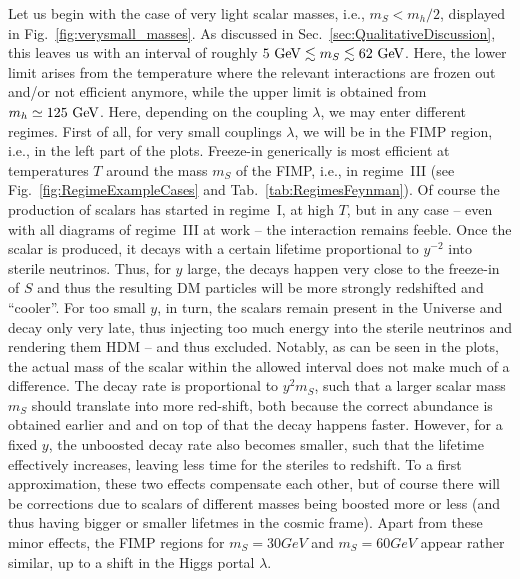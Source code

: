 Let us begin with the case of very light scalar masses, i.e., $m_S < m_h/2$, displayed in Fig.~\ref{fig:verysmall_masses}. As discussed in Sec.~\ref{sec:QualitativeDiscussion}, this leaves us with an interval of roughly $5~{\rm GeV} \lesssim m_S \lesssim 62~{\rm GeV}$. Here, the lower limit arises from the temperature where the relevant interactions are frozen out and/or not efficient anymore, while the upper limit is obtained from $m_h \simeq 125~{\rm GeV}$. Here, depending on the coupling $\lambda$, we may enter different regimes. First of all, for very small couplings $\lambda$, we will be in the FIMP region, i.e., in the left part of the plots. Freeze-in generically is most efficient at temperatures $T$ around the mass $m_S$ of the FIMP, i.e., in regime~III (see Fig.~\ref{fig:RegimeExampleCases} and Tab.~\ref{tab:RegimesFeynman}). Of course the production of scalars has started in regime~I, at high $T$, but in any case -- even with all diagrams of regime~III at work -- the interaction remains feeble. Once the scalar is produced, it decays with a certain lifetime proportional to $y^{-2}$ into sterile neutrinos. Thus, for $y$ large, the decays happen very close to the freeze-in of $S$ and thus the resulting DM particles will be more strongly redshifted and ``cooler''. For too small $y$, in turn, the scalars remain present in the Universe and decay only very late, thus injecting too much energy into the sterile neutrinos and rendering them HDM -- and thus excluded. Notably, as can be seen in the plots, the actual mass of the scalar within the allowed interval does not make much of a difference. The decay rate is proportional to $y^{2} m_S$, such that a larger scalar mass $m_S$ should translate into more red-shift, both because the correct abundance is obtained earlier and and on top of that the decay happens faster. However, for a fixed $y$, the unboosted decay rate also becomes smaller, such that the lifetime effectively increases, leaving less time for the steriles to redshift. To a first approximation, these two effects compensate each other, but of course there will be corrections due to scalars of different masses being boosted more or less (and thus having bigger or smaller lifetmes in the cosmic frame). Apart from these minor effects, the FIMP regions for $m_S=\unit{30}{GeV}$ and $m_S=\unit{60}{GeV}$ appear rather similar, up to a shift in the Higgs portal $\lambda$.

